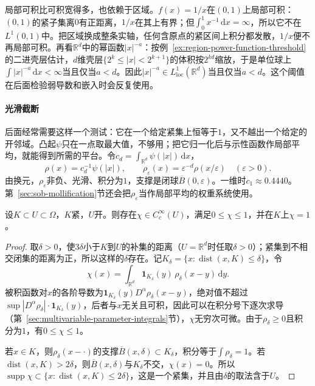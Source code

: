 局部可积比可积宽得多，也依赖于区域。$f(x)=1/x$在$(0,1)$上局部可积：$(0,1)$的紧子集离$0$有正距离，$1/x$在其上有界；但$\int_0^1 x^{-1}\,\mathrm dx=\infty$，所以它不在$L^1(0,1)$中。把区域换成整条实轴，任何含原点的紧区间上积分都发散，$1/x$便不再局部可积。再看$\mathbb R^d$中的幂函数$|x|^{-a}$：按例~\ref{ex:region-power-function-threshold}的二进壳层估计，$d$维壳层$\{2^k\le|x|<2^{k+1}\}$的体积按$2^{kd}$缩放，于是单位球上$\int|x|^{-a}\,\mathrm dx<\infty$当且仅当$a<d$。因此$|x|^{-a}\in L^1_{\mathrm{loc}}(\mathbb R^d)$当且仅当$a<d$。这个阈值在后面检验弱导数和嵌入时会反复使用。

\paragraph{光滑截断}
后面经常需要这样一个测试：它在一个给定紧集上恒等于$1$，又不越出一个给定的开邻域。凸起$\psi$只在一点取最大值，不够用；把它归一化后与示性函数作局部平均，就能得到所需的平台。令$c_d=\int_{\mathbb R^d}\psi(|x|)\,\mathrm dx$，
\begin{equation}
 \rho(x)=c_d^{-1}\psi(|x|),\qquad \rho_\varepsilon(x)=\varepsilon^{-d}\rho(x/\varepsilon)\quad(\varepsilon>0).
 \label{eq:sob-mollifier}
\end{equation}
由换元，$\rho_\varepsilon$非负、光滑、积分为$1$，支撑是闭球$\overline{B}(0,\varepsilon)$。一维时$c_1\approx0.4440$。第~\ref{sec:sob-mollification}节还会把$\rho_\varepsilon$当作局部平均的权重系统使用。

\begin{lemma}[光滑截断]
\label{lem:sob-cutoff}
设$K\subset U\subset\Omega$，$K$紧，$U$开。则存在$\chi\in C_c^\infty(U)$，满足$0\le\chi\le1$，并在$K$上$\chi=1$。
\end{lemma}

\begin{proof}
取$\delta>0$，使$3\delta$小于$K$到$U$的补集的距离（$U=\mathbb R^d$时任取$\delta>0$）；紧集到不相交闭集的距离为正，所以这样的$\delta$存在。记$K_\delta=\{x:\operatorname{dist}(x,K)\le\delta\}$，令
\[
 \chi(x)=\int_{\mathbb R^d}\mathbf 1_{K_\delta}(y)\,\rho_\delta(x-y)\,\mathrm dy .
\]
被积函数对$x$的各阶导数为$\mathbf 1_{K_\delta}(y)D^\alpha\rho_\delta(x-y)$，绝对值不超过$\sup|D^\alpha\rho_\delta|\cdot\mathbf 1_{K_\delta}(y)$，后者与$x$无关且可积，因此可以在积分号下逐次求导（第~\ref{sec:multivariable-parameter-integrals}节），$\chi$无穷次可微。由于$\rho_\delta\ge0$且积分为$1$，有$0\le\chi\le1$。

若$x\in K$，则$\rho_\delta(x-\cdot)$的支撑$\overline B(x,\delta)\subset K_\delta$，积分等于$\int\rho_\delta=1$。若$\operatorname{dist}(x,K)>2\delta$，则$\overline B(x,\delta)$与$K_\delta$不交，$\chi(x)=0$。所以$\operatorname{supp}\chi\subset\{x:\operatorname{dist}(x,K)\le2\delta\}$，这是一个紧集，并且由$\delta$的取法含于$U$。
\end{proof}

